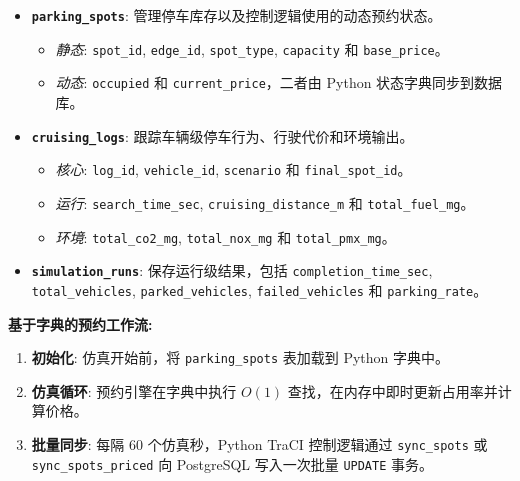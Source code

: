 \documentclass[conference]{IEEEtran}
\begin{document}
\begin{itemize}
    \item \textbf{\texttt{parking\_spots}}: 管理停车库存以及控制逻辑使用的动态预约状态。
          \begin{itemize}
              \item \textit{静态}: \texttt{spot\_id}, \texttt{edge\_id}, \texttt{spot\_type}, \texttt{capacity} 和 \texttt{base\_price}。
              \item \textit{动态}: \texttt{occupied} 和 \texttt{current\_price}，二者由 Python 状态字典同步到数据库。
          \end{itemize}
    \item \textbf{\texttt{cruising\_logs}}: 跟踪车辆级停车行为、行驶代价和环境输出。
          \begin{itemize}
              \item \textit{核心}: \texttt{log\_id}, \texttt{vehicle\_id}, \texttt{scenario} 和 \texttt{final\_spot\_id}。
              \item \textit{运行}: \texttt{search\_time\_sec}, \texttt{cruising\_distance\_m} 和 \texttt{total\_fuel\_mg}。
              \item \textit{环境}: \texttt{total\_co2\_mg}, \texttt{total\_nox\_mg} 和 \texttt{total\_pmx\_mg}。
          \end{itemize}
    \item \textbf{\texttt{simulation\_runs}}: 保存运行级结果，包括 \texttt{completion\_time\_sec}, \texttt{total\_vehicles}, \texttt{parked\_vehicles}, \texttt{failed\_vehicles} 和 \texttt{parking\_rate}。
\end{itemize}

\textbf{基于字典的预约工作流:}
\begin{enumerate}
    \item \textbf{初始化}: 仿真开始前，将 \texttt{parking\_spots} 表加载到 Python 字典中。
    \item \textbf{仿真循环}: 预约引擎在字典中执行 $O(1)$ 查找，在内存中即时更新占用率并计算价格。
    \item \textbf{批量同步}: 每隔 60 个仿真秒，Python TraCI 控制逻辑通过 \texttt{sync\_spots} 或 \texttt{sync\_spots\_priced} 向 PostgreSQL 写入一次批量 \texttt{UPDATE} 事务。
\end{enumerate}
\end{document}
